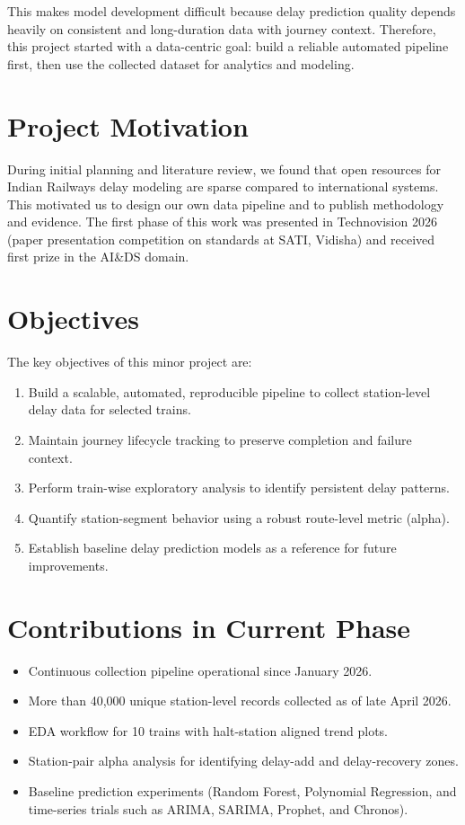 \documentclass[12pt,a4paper]{report}
\begin{document}
This makes model development difficult because delay prediction quality depends heavily on consistent and long-duration data with journey context. Therefore, this project started with a data-centric goal: build a reliable automated pipeline first, then use the collected dataset for analytics and modeling.

\section{Project Motivation}
During initial planning and literature review, we found that open resources for Indian Railways delay modeling are sparse compared to international systems. This motivated us to design our own data pipeline and to publish methodology and evidence. The first phase of this work was presented in Technovision 2026 (paper presentation competition on standards at SATI, Vidisha) and received first prize in the AI\&DS domain.

\section{Objectives}
The key objectives of this minor project are:
\begin{enumerate}
    \item Build a scalable, automated, reproducible pipeline to collect station-level delay data for selected trains.
    \item Maintain journey lifecycle tracking to preserve completion and failure context.
    \item Perform train-wise exploratory analysis to identify persistent delay patterns.
    \item Quantify station-segment behavior using a robust route-level metric (alpha).
    \item Establish baseline delay prediction models as a reference for future improvements.
\end{enumerate}

\section{Contributions in Current Phase}
\begin{itemize}
    \item Continuous collection pipeline operational since January 2026.
    \item More than 40,000 unique station-level records collected as of late April 2026.
    \item EDA workflow for 10 trains with halt-station aligned trend plots.
    \item Station-pair alpha analysis for identifying delay-add and delay-recovery zones.
    \item Baseline prediction experiments (Random Forest, Polynomial Regression, and time-series trials such as ARIMA, SARIMA, Prophet, and Chronos).
\end{itemize}
\end{document}

